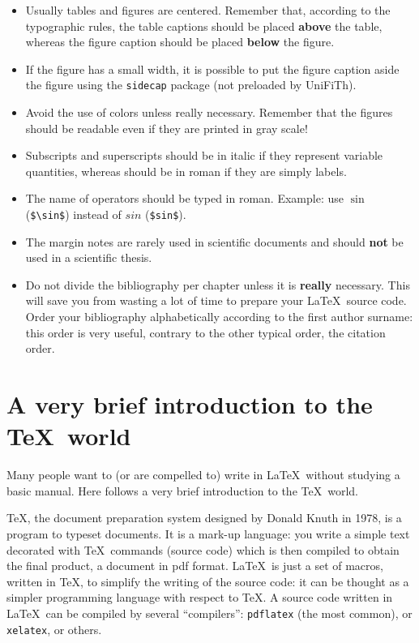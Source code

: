 \documentclass[a5paper,11pt]{article}
\newcommand{\bs}{\textbackslash}
\begin{document}
\begin{itemize}
\item Usually tables and figures are centered. Remember that, according to the typographic rules, the table captions should be placed \textbf{above} the table, whereas the figure caption should be placed \textbf{below} the figure.

\item If the figure has a small width, it is possible to put the figure caption
aside the figure using the \texttt{sidecap} package (not preloaded by \textsf{UniFiTh}).

\item Avoid the use of colors unless really necessary. Remember that the figures should be readable even if they are printed in gray scale!

\item Subscripts and superscripts should be in italic if they represent variable quantities, whereas should be in roman if they are simply labels.

\item The name of operators should be typed in roman. Example: use $\sin$ (\texttt{\$\bs sin\$}) instead of $sin$ (\texttt{\$sin\$}).

\item The margin notes are rarely used in scientific documents and should \textbf{not} be used in a scientific thesis.

\item Do not divide the bibliography per chapter unless it is \textbf{really} necessary.
This will save you from wasting a lot of time to prepare your \LaTeX\ source code.
Order your bibliography alphabetically according to the
first author surname: this order is very useful, contrary to the other typical order, the citation order.

\end{itemize}

\clearpage
\appendix

\section{A very brief introduction to the \TeX\ world}

Many people want to (or are compelled to) write in \LaTeX\ without studying
a basic manual. Here follows a very brief introduction to the \TeX\ world.

\TeX, the document preparation system designed by Donald Knuth in 1978, is a program to typeset documents.
It is a mark-up language: you write a simple text decorated with \TeX\ commands (source code) which is then compiled to obtain the final product, a document in pdf format. 
\LaTeX\ is just a set of macros, written in \TeX, to simplify the writing of the source code: it can be thought as a simpler programming language with respect to \TeX. A source code written in \LaTeX\ can be compiled by several ``compilers'': \texttt{pdflatex} (the most common), or \texttt{xelatex}, or others.
\end{document}
